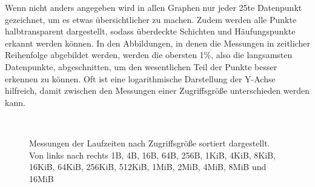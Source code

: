 \documentclass[
	12pt,
	a4paper,
	BCOR10mm,
	DIV14,
	listof=totoc,
	bibliography=totoc,
	headsepline
]{scrreprt}
\begin{document}
Wenn nicht anders angegeben wird in allen Graphen nur jeder 25te Datenpunkt gezeichnet, um es etwas übersichtlicher zu machen.
Zudem werden alle Punkte halbtransparent dargestellt, sodass überdeckte Schichten und Häufungspunkte erkannt werden können.
In den Abbildungen, in denen die Messungen in zeitlicher Reihenfolge abgebildet werden, werden die obersten 1\%, also die langsamsten Datenpunkte, abgeschnitten, um den wesentlichen Teil der Punkte besser erkennen zu können.
Oft ist eine logarithmische Darstellung der Y-Achse hilfreich, damit zwischen den Messungen einer Zugriffsgröße unterschieden werden kann. 
\begin{figure}
	\hfill
	\\
	\hfill
	\caption{Messungen der Laufzeiten nach Zugriffsgröße sortiert dargestellt. Von links nach rechts 1B, 4B, 16B, 64B, 256B, 1KiB, 4KiB, 8KiB, 16KiB, 64KiB, 256KiB, 512KiB, 1MiB, 2MiB, 4MiB, 8MiB und 16MiB}
	\label{Laufzeiten_Zeitreihe}
\end{figure} 
\end{document}

